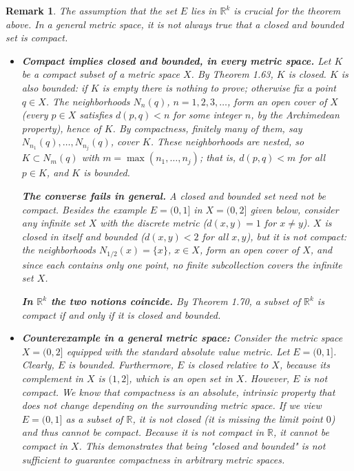 \documentclass{article}
\theoremstyle{mythm}
\newtheorem{remark}[theorem]{Remark}
\begin{document}
\begin{remark}
The assumption that the set $E$ lies in $\mathbb{R}^k$ is crucial for the theorem above. In a general metric space, it is not always true that a closed and bounded set is compact.

\begin{itemize}
    \item \textbf{Compact implies closed and bounded, in every metric space.} Let $K$ be a compact subset of a metric space $X$. By Theorem 1.63, $K$ is closed. $K$ is also bounded: if $K$ is empty there is nothing to prove; otherwise fix a point $q \in X$. The neighborhoods $N_n(q)$, $n = 1, 2, 3, \dots$, form an open cover of $X$ (every $p \in X$ satisfies $d(p,q) < n$ for some integer $n$, by the Archimedean property), hence of $K$. By compactness, finitely many of them, say $N_{n_1}(q), \dots, N_{n_j}(q)$, cover $K$. These neighborhoods are nested, so $K \subset N_m(q)$ with $m = \max(n_1, \dots, n_j)$; that is, $d(p,q) < m$ for all $p \in K$, and $K$ is bounded.

    \textbf{The converse fails in general.} A closed and bounded set need not be compact. Besides the example $E = (0,1]$ in $X = (0,2]$ given below, consider any infinite set $X$ with the discrete metric ($d(x,y) = 1$ for $x \neq y$). $X$ is closed in itself and bounded ($d(x,y) < 2$ for all $x, y$), but it is not compact: the neighborhoods $N_{1/2}(x) = \{x\}$, $x \in X$, form an open cover of $X$, and since each contains only one point, no finite subcollection covers the infinite set $X$.

    \textbf{In $\mathbb{R}^k$ the two notions coincide.} By Theorem 1.70, a subset of $\mathbb{R}^k$ is compact if and only if it is closed and bounded.

    \item \textbf{Counterexample in a general metric space:} 
    Consider the metric space $X = (0, 2]$ equipped with the standard absolute value metric. Let $E = (0, 1]$. 
    Clearly, $E$ is bounded. Furthermore, $E$ is closed \textit{relative to} $X$, because its complement in $X$ is $(1, 2]$, which is an open set in $X$. 
    However, $E$ is not compact. We know that compactness is an absolute, intrinsic property that does not change depending on the surrounding metric space. If we view $E = (0, 1]$ as a subset of $\mathbb{R}$, it is not closed (it is missing the limit point $0$) and thus cannot be compact. Because it is not compact in $\mathbb{R}$, it cannot be compact in $X$. This demonstrates that being "closed and bounded" is not sufficient to guarantee compactness in arbitrary metric spaces.
    

\end{itemize}
\end{remark}
\end{document}
